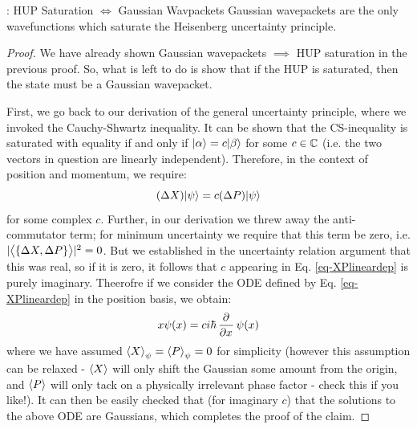 \begin{propbox}{: HUP Saturation $\iff$ Gaussian Wavpackets}\label{prop-GaussianHUPsaturation}
    Gaussian wavepackets are the only wavefunctions which saturate the Heisenberg uncertainty principle.
\end{propbox}
\begin{proof}
    We have already shown Gaussian wavepackets $\implies$ HUP saturation in the previous proof. So, what is left to do is show that if the HUP is saturated, then the state must be a Gaussian wavepacket.

    First, we go back to our derivation of the general uncertainty principle, where we invoked the Cauchy-Shwartz inequality. It can be shown that the CS-inequality is saturated with equality if and only if $\lvert \alpha \rangle = c\lvert \beta \rangle$ for some $c \in \mathbb{C}$ (i.e. the two vectors in question are linearly independent). Therefore, in the context of position and momentum, we require:
    \begin{equation}\label{eq-XPlineardep}
        (\Delta X)\lvert \psi \rangle = c(\Delta P)\lvert \psi \rangle
    \end{equation}
    for some complex $c$. Further, in our derivation we threw away the anti-commutator term; for minimum uncertainty we require that this term be zero, i.e. $\lvert \left< \set{\Delta X, \Delta P} \right> \rvert^2 = 0$. But we established in the uncertainty relation argument that this was real, so if it is zero, it follows that $c$ appearing in Eq. \eqref{eq-XPlineardep} is purely imaginary. Theerofre if we consider the ODE defined by Eq. \eqref{eq-XPlineardep} in the position basis, we obtain:
    \begin{equation}
        x\psi(x) = ci\hbar\dpd{}{x}\psi(x)
    \end{equation}
    where we have assumed $\left< X \right>_\psi = \left< P \right>_\psi = 0$ for simplicity (however this assumption can be relaxed - $\left< X \right>$ will only shift the Gaussian some amount from the origin, and $\left< P \right>$ will only tack on a physically irrelevant phase factor - check this if you like!). It can then be easily checked that (for imaginary $c$) that the solutions to the above ODE are Gaussians, which completes the proof of the claim.
\end{proof}

